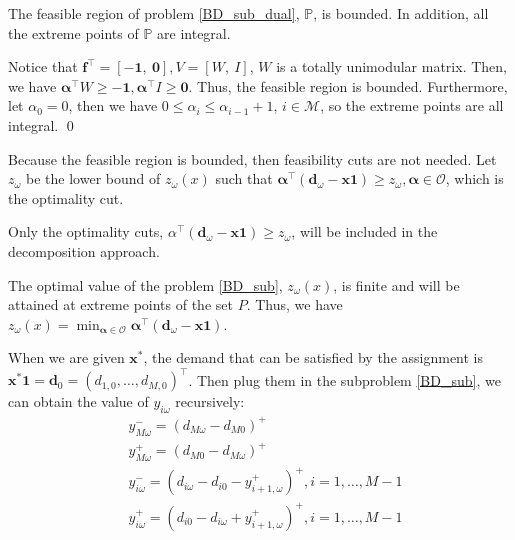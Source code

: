 \begin{lem}\label{feasible_region}
  The feasible region of problem \eqref{BD_sub_dual}, $\mathbb{P}$, is bounded. In addition, all the extreme points of $\mathbb{P}$ are integral.
\end{lem}

\begin{pf}
Notice that $\mathbf{f}^{\intercal} = [-\mathbf{1},~\mathbf{0}], V =[W,~I]$, $W$ is a totally unimodular matrix. Then, we have $\bm{\alpha}^{\intercal}W \geq -\mathbf{1}, \bm{\alpha}^{\intercal} I \geq \mathbf{0}$. Thus, the feasible region is bounded. 
Furthermore, let $\alpha_0 = 0$, then we have $0 \leq \alpha_i \leq \alpha_{i-1} +1$, $i \in \mathcal{M}$, so the extreme points are all integral.
\qed
\end{pf}

Because the feasible region is bounded, then feasibility cuts are not needed. Let $z_{\omega}$ be the lower bound of $z_{\omega}(x)$ such that $\bm{\alpha}^{\intercal}(\mathbf{d}_{\omega}- \mathbf{x} \mathbf{1}) \geq z_{\omega}, \bm{\alpha} \in \mathcal{O}$, which is the optimality cut.

\begin{corollary}
  Only the optimality cuts, $\alpha^{\intercal}(\mathbf{d}_{\omega}- \mathbf{x} \mathbf{1}) \geq z_{\omega}$, will be included in the decomposition approach.
\end{corollary}

\begin{corollary}
The optimal value of the problem \eqref{BD_sub}, $z_{\omega}(x)$, is finite and will be attained at extreme points of the set $P$. Thus, we have $z_{\omega}(x) = \min_{\bm{\alpha} \in \mathcal{O}} \bm{\alpha}^{\intercal}(\mathbf{d}_{\omega}- \mathbf{x} \mathbf{1})$. 
\end{corollary}


When we are given $\mathbf{x}^{*}$, the demand that can be satisfied by the assignment is $\mathbf{x}^{*} \mathbf{1} = \mathbf{d}_0 = (d_{1,0},\ldots,d_{M,0})^{\intercal}$.
Then plug them in the subproblem \eqref{BD_sub}, we can obtain the value of $y_{i \omega}$ recursively:
\begin{equation}\label{y_recursively}
\begin{aligned}
  & y_{M \omega}^{-}=\left(d_{M \omega}-d_{M 0}\right)^{+} \\
  & y_{M \omega}^{+}=\left(d_{M 0}-d_{M \omega}\right)^{+} \\
  & y_{i \omega}^{-}=\left(d_{i \omega}-d_{i 0} - y_{i+1, \omega}^{+} \right)^{+}, i =1,\ldots, M-1 \\
  & y_{i \omega}^{+}=\left(d_{i 0}- d_{i \omega} + y_{i+1, \omega}^{+}\right)^{+}, i =1,\ldots, M-1
\end{aligned}
\end{equation}

